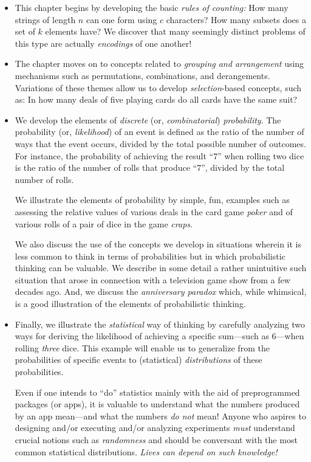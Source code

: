 \begin{itemize}
\item
This chapter begins by developing the basic {\em rules of counting:}
How many strings of length $n$ can one form using $c$ characters?  How
many subsets does a set of $k$ elements have?  We discover that many
seemingly distinct problems of this type are actually {\em encodings}
of one another!

\item
The chapter moves on to concepts related to {\em grouping and
  arrangement} using mechanisms such as permutations, combinations,
and derangements.  Variations of these themes allow us to develop {\em
  selection}-based concepts, such as: In how many deals of five playing
cards do all cards have the same suit?

\item
We develop the elements of {\em discrete} (or, {\em combinatorial})
{\em probability}.  The probability (or, {\it likelihood}) of an event
is defined as the ratio of the number of ways that the event occurs,
divided by the total possible number of outcomes.  For instance, the
probability of achieving the result ``$7$'' when rolling two dice is
the ratio of the number of rolls that produce ``$7$'', divided by the
total number of rolls.

We illustrate the elements of probability by simple, fun, examples
such as assessing the relative values of various deals in the card
game {\it poker} and of various rolls of a pair of dice in the game
{\it craps}.

We also discuss the use of the concepts we develop in situations
wherein it is less common to think in terms of probabilities but in
which probabilistic thinking can be valuable.  We describe in some
detail a rather unintuitive such situation that arose in connection
with a television game show from a few decades ago.  And, we discuss
the {\it anniversary paradox} which, while whimsical, is a good
illustration of the elements of probabilistic thinking.

\item
Finally, we illustrate the {\em statistical} way of thinking by
carefully analyzing two ways for deriving the likelihood of achieving
a specific sum---such as $6$---when rolling {\em three} dice.  This
example will enable us to generalize from the probabilities of
specific events to (statistical) {\it distributions} of these
probabilities.

Even if one intends to ``do'' statistics mainly with the aid of
preprogrammed packages (or apps), it is valuable to understand what
the numbers produced by an app mean---and what the numbers {\em do
  not} mean!  Anyone who aspires to designing and/or executing and/or
analyzing experiments {\em must} understand crucial notions such as
{\em randomness} and should be conversant with the most common
statistical distributions.  {\em Lives can depend on such knowledge!}
\end{itemize}

